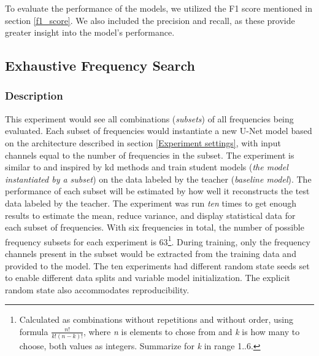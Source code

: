         To evaluate the performance of the models, we utilized the F1 score mentioned in section \ref{f1_score}. We also included the precision and recall, as these provide greater insight into the model's performance.
        
    
    \subsection{Exhaustive Frequency Search}
        \subsubsection{Description}
        This experiment would see all combinations (\textit{subsets}) of all frequencies being evaluated. Each subset of frequencies would instantiate a new U-Net model based on the architecture described in section \ref{Experiment settings}, with input channels equal to the number of frequencies in the subset. The experiment is similar to and inspired by \gls{kd} methods and train student models (\textit{the model instantiated by a subset}) on the data labeled by the teacher (\textit{baseline model}). The performance of each subset will be estimated by how well it reconstructs the test data labeled by the teacher. The experiment was run \textit{ten} times to get enough results to estimate the mean, reduce variance, and display statistical data for each subset of frequencies. With six frequencies in total, the number of possible frequency subsets for each experiment is 63\footnote{Calculated as combinations without repetitions and without order, using formula $\frac{n!}{k!(n-k)!}$, where \textit{n} is elements to chose from and \textit{k} is how many to choose, both values as integers. Summarize for \textit{k} in range 1..6.}.  During training, only the frequency channels present in the subset would be extracted from the training data and provided to the model. The ten experiments had different random state seeds set to enable different data splits and variable model initialization. The explicit random state also accommodates reproducibility. 
        
